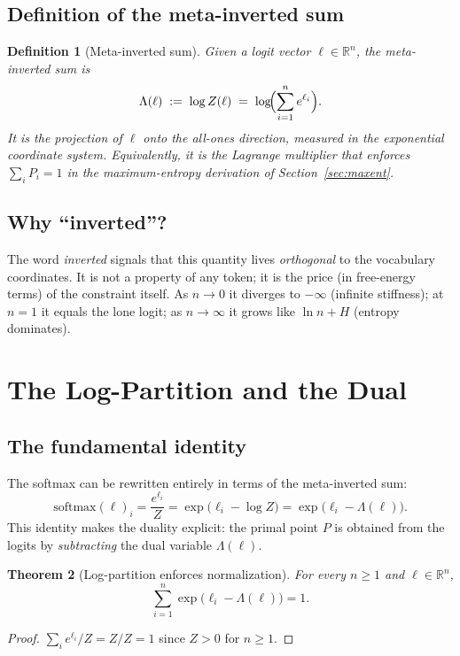 \documentclass[11pt]{article}
\newtheorem{theorem}{Theorem}[section]
\newtheorem{definition}[theorem]{Definition}
\newcommand{\RR}{\mathbb{R}}
\newcommand{\softmax}{\mathrm{softmax}}
\begin{document}
\subsection{Definition of the meta-inverted sum}
\label{sec:meta-def}

\begin{definition}[Meta-inverted sum]
Given a logit vector $\ell\in\RR^n$, the \emph{meta-inverted sum} is
\[
\Lambda(\ell) \;:=\; \log Z(\ell)
\;=\; \log\!\Bigl(\sum_{i=1}^n e^{\ell_i}\Bigr).
\]
It is the projection of $\ell$ onto the all-ones direction, measured in the
exponential coordinate system. Equivalently, it is the Lagrange multiplier that
enforces $\sum_i P_i = 1$ in the maximum-entropy derivation of
Section~\ref{sec:maxent}.
\end{definition}

\subsection{Why ``inverted''?}
\label{sec:meta-why}

The word \emph{inverted} signals that this quantity lives \emph{orthogonal} to
the vocabulary coordinates. It is not a property of any token; it is the price
(in free-energy terms) of the constraint itself. As $n\to 0$ it diverges to
$-\infty$ (infinite stiffness); at $n=1$ it equals the lone logit; as
$n\to\infty$ it grows like $\ln n + H$ (entropy dominates).

\section{The Log-Partition and the Dual}
\label{sec:logpart}

\subsection{The fundamental identity}
\label{sec:logpart-id}

The softmax can be rewritten entirely in terms of the meta-inverted sum:
\[
\softmax(\ell)_i
= \frac{e^{\ell_i}}{Z}
= \exp\!\bigl(\ell_i - \log Z\bigr)
= \exp\!\bigl(\ell_i - \Lambda(\ell)\bigr).
\]
This identity makes the duality explicit: the primal point $P$ is obtained from
the logits by \emph{subtracting} the dual variable $\Lambda(\ell)$.

\begin{theorem}[Log-partition enforces normalization]
\label{thm:logpart}
For every $n\ge 1$ and $\ell\in\RR^n$,
\[
\sum_{i=1}^n \exp\!\bigl(\ell_i - \Lambda(\ell)\bigr) = 1.
\]
\end{theorem}
\begin{proof}
$\sum_i e^{\ell_i}/Z = Z/Z = 1$ since $Z>0$ for $n\ge 1$.
\end{proof}
\end{document}
